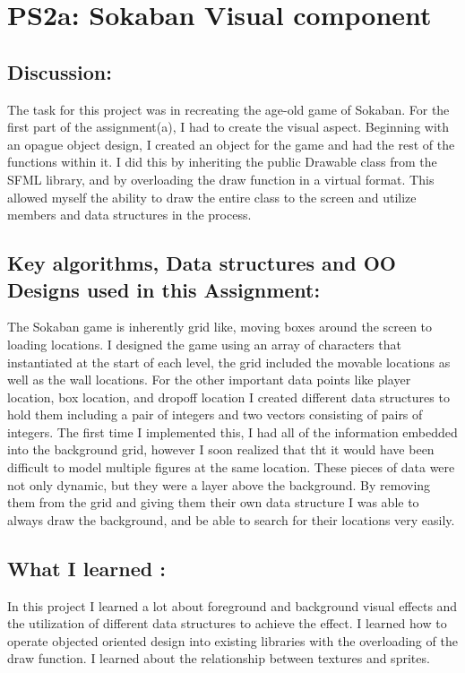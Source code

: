 \section{PS2a: Sokaban Visual component}\label{sec:ps3a}
\graphicspath{{ps3a}}
\subsection{Discussion:}\label{sec:ps3a:disc}
The task for this project was in recreating the age-old game of Sokaban. For the first part of the assignment(a), I had to create the visual aspect. Beginning with an opague object design, I created an object for the game and had the rest of the functions within it. I did this by inheriting the public Drawable class from the SFML library, and by overloading the draw function in a virtual format. This allowed myself the ability to draw the entire class to the screen and utilize members and data structures in the process.
    
\subsection{Key algorithms, Data structures and OO Designs used in this Assignment:}\label{sec:ps3a:kdo}
The Sokaban game is inherently grid like, moving boxes around the screen to loading locations. I designed the game using an array of characters that instantiated at the start of each level, the grid included the movable locations as well as the wall locations. For the other important data points like player location, box location, and dropoff location I created different data structures to hold them including a pair of integers and two vectors consisting of pairs of integers. The first time I implemented this, I had all of the information embedded into the background grid, however I soon realized that tht it would have been difficult to model multiple figures at the same location. These pieces of data were not only dynamic, but they were a layer above the background. By removing them from the grid and giving them their own data structure I was able to always draw the background, and be able to search for their locations very easily. 

\subsection{What I learned :}\label{sec:ps2a:learn}

In this project I learned a lot about foreground and background visual effects and the utilization of different data structures to achieve the effect. I learned how to operate objected oriented design into existing libraries with the overloading of the draw function. I learned about the relationship between textures and sprites. 

